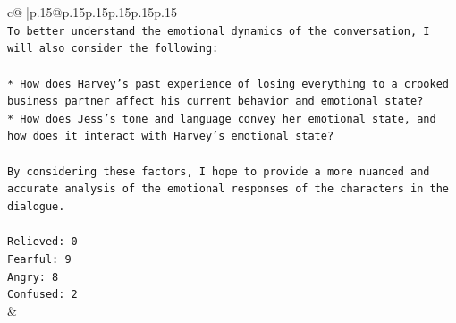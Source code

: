 \documentclass{article}
\begin{document}
{\begin{supertabular}{c@{$\;$}|p{.15\linewidth}@{}p{.15\linewidth}p{.15\linewidth}p{.15\linewidth}p{.15\linewidth}p{.15\linewidth}}
{{{\\ 
\texttt{To better understand the emotional dynamics of the conversation, I will also consider the following:} \\
\\ 
\texttt{* How does Harvey's past experience of losing everything to a crooked business partner affect his current behavior and emotional state?} \\
\texttt{* How does Jess's tone and language convey her emotional state, and how does it interact with Harvey's emotional state?} \\
\\ 
\texttt{By considering these factors, I hope to provide a more nuanced and accurate analysis of the emotional responses of the characters in the dialogue.} \\
\\ 
\texttt{Relieved: 0} \\
\texttt{Fearful: 9} \\
\texttt{Angry: 8} \\
\texttt{Confused: 2} \\
            }
        }
    }
    & \\ \\

\end{supertabular}
}
\end{document}
